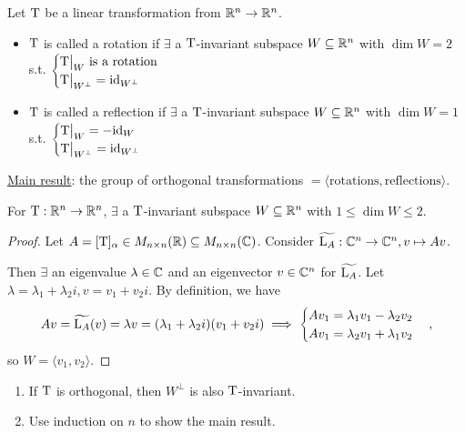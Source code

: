 \begin{definition}
  Let $\rm T$ be a linear transformation from $\mathbb{R}^n \to \mathbb{R}^n$.
  \begin{itemize}
    \item $\rm T$ is called a rotation if $\exists$ a $\rm T$-invariant
      subspace $W \subseteq \mathbb{R}^n$ with $\dim W = 2$ s.t.
      $\begin{cases}
        {\rm T} \big|_W \text{~is a rotation} \\
        {\rm T} \big|_{W^\bot} = {\rm id}_{W^\bot}
      \end{cases}$
    \item $\rm T$ is called a reflection if $\exists$ a $\rm T$-invariant
      subspace $W \subseteq \mathbb{R}^n$ with $\dim W = 1$ s.t.
      $\begin{cases}
        {\rm T} \big|_W = -{\rm id}_W \\
        {\rm T} \big|_{W^\bot} = {\rm id}_{W^\bot}
      \end{cases}$
  \end{itemize}
\end{definition}

\underline{Main result}: the group of orthogonal transformations
$= \langle \text{rotations}, \text{reflections} \rangle$.

\begin{prop}
  For ${\rm T}: \mathbb{R}^n \to \mathbb{R}^n$, $\exists$ a $\rm T$-invariant
  subspace $W \subseteq \mathbb{R}^n$ with $1 \le \dim W \le 2$.
  \begin{proof}
    Let $A=[{\rm T}]_\alpha \in M_{n\times n}(\mathbb{R}) \subseteq M_{n\times n}(\mathbb{C})$.
    Consider $\widetilde{{\rm L}_A}: \mathbb{C}^n \to \mathbb{C}^n, v \mapsto Av$.

    Then $\exists$ an eigenvalue $\lambda \in \mathbb{C}$ and an eigenvector
    $v \in \mathbb{C}^n$ for $\widetilde{{\rm L}_A}$.
    Let $\lambda = \lambda_1 + \lambda_2 i, v = v_1 + v_2 i$. By definition,
    we have
    \[
      Av = \widetilde{{\rm L}_A}(v) = \lambda v =
      (\lambda_1 + \lambda_2 i)(v_1 + v_2 i)
      \implies \begin{cases}
        Av_1 = \lambda_1 v_1 - \lambda_2 v_2 \\
        Av_1 = \lambda_2 v_1 + \lambda_1 v_2
      \end{cases},
    \]
    so $W = \langle v_1, v_2 \rangle$.
  \end{proof}
\end{prop}

\begin{exercise} \mbox{}
  \begin{enumerate}
    \item If $\rm T$ is orthogonal, then $W^\bot$ is also $\rm T$-invariant.
    \item Use induction on $n$ to show the main result.
  \end{enumerate}
\end{exercise}

